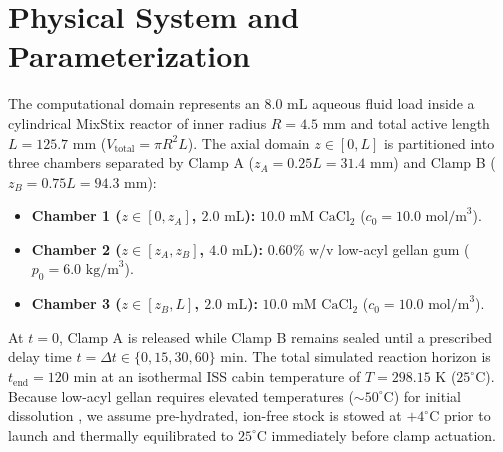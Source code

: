 \documentclass[11pt,twocolumn]{article}
\begin{document}
\section{Physical System and Parameterization}
The computational domain represents an $8.0\text{ mL}$ aqueous fluid load inside a cylindrical MixStix reactor of inner radius $R = 4.5\text{ mm}$ and total active length $L = 125.7\text{ mm}$ ($V_{\text{total}} = \pi R^2 L$). The axial domain $z \in [0, L]$ is partitioned into three chambers separated by Clamp A ($z_A = 0.25L = 31.4\text{ mm}$) and Clamp B ($z_B = 0.75L = 94.3\text{ mm}$):
\begin{itemize}
    \item \textbf{Chamber 1 ($z \in [0, z_A]$, $2.0\text{ mL}$):} $10.0\text{ mM CaCl}_2$ ($c_0 = 10.0\text{ mol/m}^3$).
    \item \textbf{Chamber 2 ($z \in [z_A, z_B]$, $4.0\text{ mL}$):} $0.60\%\text{ w/v}$ low-acyl gellan gum ($p_0 = 6.0\text{ kg/m}^3$).
    \item \textbf{Chamber 3 ($z \in [z_B, L]$, $2.0\text{ mL}$):} $10.0\text{ mM CaCl}_2$ ($c_0 = 10.0\text{ mol/m}^3$).
\end{itemize}
At $t = 0$, Clamp A is released while Clamp B remains sealed until a prescribed delay time $t = \Delta t \in \{0, 15, 30, 60\}\text{ min}$. The total simulated reaction horizon is $t_{\text{end}} = 120\text{ min}$ at an isothermal ISS cabin temperature of $T = 298.15\text{ K}$ ($25^\circ\text{C}$). Because low-acyl gellan requires elevated temperatures ($\sim 50^\circ\text{C}$) for initial dissolution \cite{ambebila2019}, we assume pre-hydrated, ion-free stock is stowed at $+4^\circ\text{C}$ prior to launch \cite{voyager2026} and thermally equilibrated to $25^\circ\text{C}$ immediately before clamp actuation.
\end{document}
